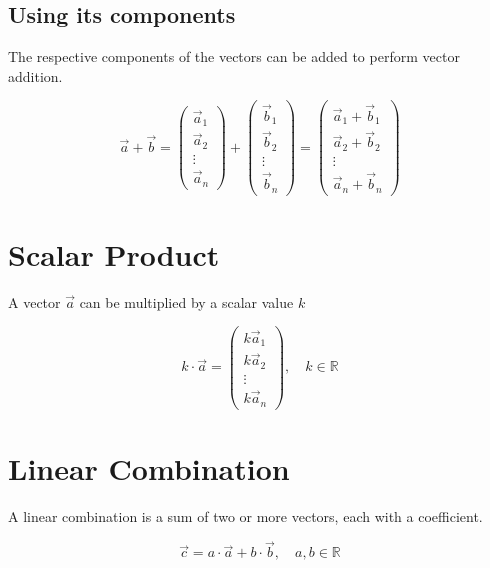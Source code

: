 \documentclass{article}
\begin{document}
\subsection{Using its components}

The respective components of the vectors can be added to perform vector addition.

\[
    \vec{a} + \vec{b} =
    \begin{pmatrix}
        \vec{a}_1 \\
        \vec{a}_2 \\
        \vdots \\
        \vec{a}_n
    \end{pmatrix}
    +
    \begin{pmatrix}
        \vec{b}_1 \\
        \vec{b}_2 \\
        \vdots \\
        \vec{b}_n
    \end{pmatrix}
    =
    \begin{pmatrix}
        \vec{a}_1 + \vec{b}_1 \\
        \vec{a}_2 + \vec{b}_2\\
        \vdots \\
        \vec{a}_n + \vec{b}_n
    \end{pmatrix}
\]

\pagebreak

\section{Scalar Product}

A vector \(\vec{a}\) can be multiplied by a scalar value \(k\)

\[
    k\cdot\vec{a} =
    \begin{pmatrix}
        k \vec{a}_1 \\
        k \vec{a}_2 \\
        \vdots \\
        k \vec{a}_n
    \end{pmatrix},
    \quad k\in\mathbb{R}
\]

\section{Linear Combination}

A linear combination is a sum of two or more vectors, each with a coefficient.

\[
    \vec{c} = a \cdot\vec{a} + b\cdot\vec{b},
    \quad a,b\in \mathbb{R}
\]
\end{document}

